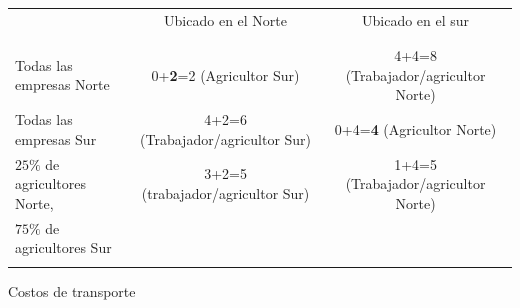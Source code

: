 \begin{center}
    \begin{tabular}{lcc}
	& Ubicado en el Norte & Ubicado en el sur \\\\
	\hline\\
	Todas las empresas Norte & 0+\textbf{2}=2 (Agricultor Sur) & 4+4=8 (Trabajador/agricultor Norte)\\
	Todas las empresas Sur &4+2=6 (Trabajador/agricultor Sur)& 0+4=\textbf{4} (Agricultor Norte)\\
	$25\%$ de agricultores Norte, & 3+2=5 (trabajador/agricultor Sur) & 1+4=5 (Trabajador/agricultor Norte)\\
	$75\%$ de agricultores Sur & &  \\
	\hline\\
    \end{tabular}
    Costos de transporte
\end{center}
\vspace{.5cm}

